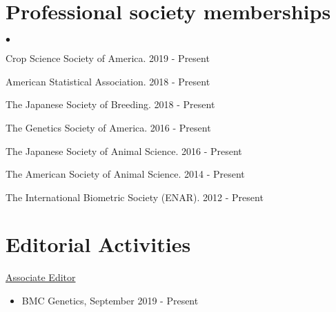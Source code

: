 \documentclass[margin,line,10pt]{res}
\newenvironment{list2}{
  \begin{list}{$\bullet$}{%
      \setlength{\itemsep}{0in}
      \setlength{\parsep}{0in} \setlength{\parskip}{0in}
      \setlength{\topsep}{0in} \setlength{\partopsep}{0in} 
      \setlength{\leftmargin}{0.2in}}}{\end{list}}
\begin{document}
\begin{resume}
\section{\sc Professional society memberships}
\begin{list2}
  \item Crop Science Society of America. 2019 - Present
    \vspace{0.3cm}
  \item American Statistical Association. 2018 - Present
    \vspace{0.3cm}
  \item  The Japanese Society of Breeding. 2018 - Present
  \vspace{0.3cm}
\item  The Genetics Society of America. 2016 - Present
  \vspace{0.3cm}
\item  The Japanese Society of Animal Science. 2016 - Present
  \vspace{0.3cm}
\item The American Society of Animal Science. 2014 - Present
  \vspace{0.3cm}
\item The International Biometric Society (ENAR). 2012 - Present
\end{list2}



\vspace{0.5cm}
\section{\sc Editorial Activities}

\underline{Associate Editor}
\begin{itemize}
\item BMC Genetics, September 2019 - Present 
\end{itemize}
\vspace{0.3cm}


\end{resume}
\end{document}
